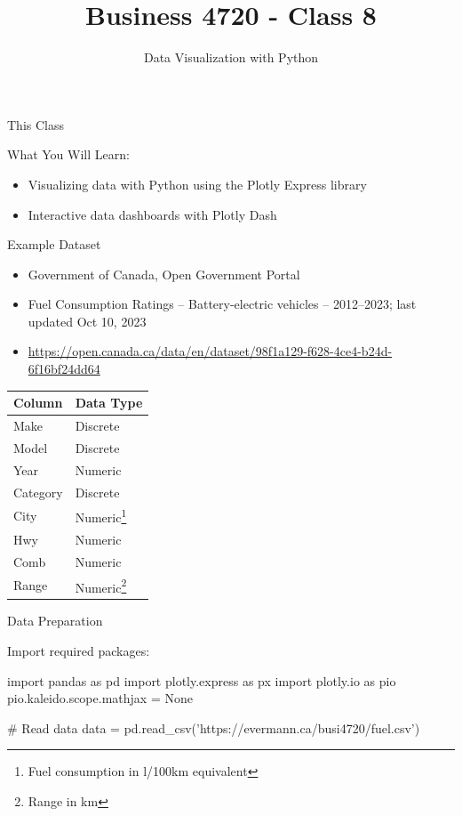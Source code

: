 \documentclass[ignorenonframetext,xcolor=x11names]{beamer}
\title{Business 4720 - Class 8}
\subtitle{Data Visualization with Python}
\begin{document}
\begin{frame}{}
  \titlepage
  \footnotesize
  
\end{frame}

\begin{frame}{This Class}

\begin{block}{What You Will Learn:}
\begin{itemize}
  \item Visualizing data with Python using the Plotly Express library
  \item Interactive data dashboards with Plotly Dash
\end{itemize}
\end{block}
\end{frame}

\begin{frame}{Example Dataset}
\begin{itemize}
  \item Government of Canada, Open Government Portal
  \item Fuel Consumption Ratings -- Battery-electric vehicles -- 2012--2023; last updated Oct 10, 2023
  \item \href{https://open.canada.ca/data/en/dataset/98f1a129-f628-4ce4-b24d-6f16bf24dd64}{https://open.canada.ca/data/en/dataset/98f1a129-f628-4ce4-b24d-6f16bf24dd64}
\end{itemize}
\centering
\footnotesize

	\begin{tabular}{|l|l|} \hline
	  {\bf Column} & {\bf Data Type} \\ \hline \hline
	  Make & Discrete \\ 
	  Model & Discrete \\
	  Year & Numeric \\
	  Category & Discrete \\
	  City & Numeric\footnote{Fuel consumption in l/100km equivalent} \\
	  Hwy & Numeric \\
	  Comb & Numeric \\
	  Range & Numeric\footnote{Range in km} \\ \hline
	\end{tabular}
\end{frame}

\begin{frame}[fragile]{Data Preparation}

Import required packages:

\begin{pythoncode}
import pandas as pd
import plotly.express as px
import plotly.io as pio
pio.kaleido.scope.mathjax = None
\end{pythoncode}

\begin{pythoncode}
# Read data
data = pd.read_csv('https://evermann.ca/busi4720/fuel.csv')
\end{pythoncode}
\end{frame}
\end{document}
